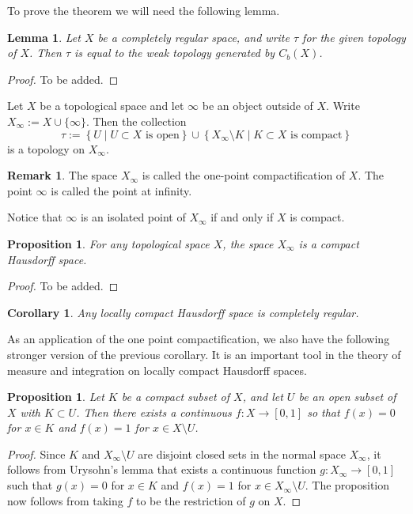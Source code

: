 \documentclass[11pt,a4paper]{article}
\theoremstyle{definition}
\newtheorem{remark}{Remark}[section]
\theoremstyle{plain}
\newtheorem{proposition}[theorem]{Proposition}
\newtheorem{lemma}[theorem]{Lemma}
\newtheorem{corollary}[theorem]{Corollary}
\newcommand{\set}[2]{ \left\{ #1 \mid #2 \right\} }
\begin{document}
  To prove the theorem we will need the following lemma.

  \begin{lemma}
    Let $X$ be a completely regular space, and write $\tau$ for the given
    topology of $X$.
    Then $\tau$ is equal to the weak topology generated by $C_b(X)$.
  \end{lemma}
  \begin{proof}
    To be added.
  \end{proof}

  Let $X$ be a topological space and let $\infty$ be an object outside of $X$.
  Write $X_{\infty} := X \cup \{\infty\}$. Then the collection
  \[
    \tau :=
    \set{U}{\text{$U \subset X$ is open}} \cup
    \set{X_{\infty} \setminus K}{\text{$K \subset X$ is compact}}
  \]
  is a topology on $X_{\infty}$.

  \begin{remark}
    The space $X_{\infty}$ is called the one-point compactification of $X$.
    The point $\infty$ is called the point at infinity.
  \end{remark}

  Notice that $\infty$ is an isolated point of $X_{\infty}$ if and only if
  $X$ is compact.

  \begin{proposition}
    For any topological space $X$, the space $X_{\infty}$ is a compact
    Hausdorff space.
  \end{proposition}
  \begin{proof}
    To be added.
  \end{proof}
  
  \begin{corollary}
    Any locally compact Hausdorff space is completely regular.
  \end{corollary}
  
  As an application of the one point compactification,
  we also have the following stronger version of the previous corollary.
  It is an important tool in the theory of measure and integration on 
  locally compact Hausdorff spaces.

  \begin{proposition}
    Let $K$ be a compact subset of $X$, and let $U$ be an open subset
    of $X$ with $K \subset U$.
    Then there exists a continuous $f \colon X \to [0, 1]$ so that 
    $f(x) = 0$ for $x \in K$ and $f(x) = 1$ for $x \in X \setminus U$.
  \end{proposition}
  \begin{proof}
    Since $K$ and $X_{\infty} \setminus U$ are disjoint closed sets in the
    normal space $X_{\infty}$, it follows from Urysohn's lemma that
    exists a continuous function $g \colon X_{\infty} \to [0,1]$ such that 
    $g(x) = 0$ for $x \in K$ and $f(x) = 1$ for $x \in X_{\infty} \setminus U$.
    The proposition now follows from taking $f$ to be the restriction of
    $g$ on $X$.
  \end{proof}
\end{document}
